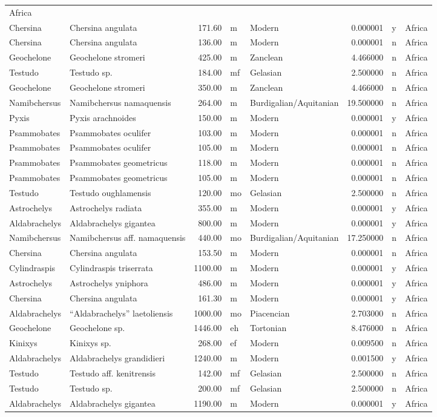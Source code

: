 \begin{landscape}
\begin{longtable}[]{@{}llrllrll@{}}
	Africa\tabularnewline
	Chersina & Chersina angulata & 171.60 & m & Modern & 0.000001 & y &
	Africa\tabularnewline
	Chersina & Chersina angulata & 136.00 & m & Modern & 0.000001 & n &
	Africa\tabularnewline
	Geochelone & Geochelone stromeri & 425.00 & m & Zanclean & 4.466000 & n
	& Africa\tabularnewline
	Testudo & Testudo sp. & 184.00 & mf & Gelasian & 2.500000 & n &
	Africa\tabularnewline
	Geochelone & Geochelone stromeri & 350.00 & m & Zanclean & 4.466000 & n
	& Africa\tabularnewline
	Namibchersus & Namibchersus namaquensis & 264.00 & m &
	Burdigalian/Aquitanian & 19.500000 & n & Africa\tabularnewline
	Pyxis & Pyxis arachnoides & 150.00 & m & Modern & 0.000001 & y &
	Africa\tabularnewline
	Psammobates & Psammobates oculifer & 103.00 & m & Modern & 0.000001 & n
	& Africa\tabularnewline
	Psammobates & Psammobates oculifer & 105.00 & m & Modern & 0.000001 & n
	& Africa\tabularnewline
	Psammobates & Psammobates geometricus & 118.00 & m & Modern & 0.000001 &
	n & Africa\tabularnewline
	Psammobates & Psammobates geometricus & 105.00 & m & Modern & 0.000001 &
	n & Africa\tabularnewline
	Testudo & Testudo oughlamensis & 120.00 & mo & Gelasian & 2.500000 & n &
	Africa\tabularnewline
	Astrochelys & Astrochelys radiata & 355.00 & m & Modern & 0.000001 & y &
	Africa\tabularnewline
	Aldabrachelys & Aldabrachelys gigantea & 800.00 & m & Modern & 0.000001
	& y & Africa\tabularnewline
	Namibchersus & Namibchersus aff. namaquensis & 440.00 & mo &
	Burdigalian/Aquitanian & 17.250000 & n & Africa\tabularnewline
	Chersina & Chersina angulata & 153.50 & m & Modern & 0.000001 & n &
	Africa\tabularnewline
	Cylindraspis & Cylindraspis triserrata & 1100.00 & m & Modern & 0.000001
	& y & Africa\tabularnewline
	Astrochelys & Astrochelys yniphora & 486.00 & m & Modern & 0.000001 & y
	& Africa\tabularnewline
	Chersina & Chersina angulata & 161.30 & m & Modern & 0.000001 & y &
	Africa\tabularnewline
	Aldabrachelys & ``Aldabrachelys'' laetoliensis & 1000.00 & mo &
	Piacencian & 2.703000 & n & Africa\tabularnewline
	Geochelone & Geochelone sp. & 1446.00 & eh & Tortonian & 8.476000 & n &
	Africa\tabularnewline
	Kinixys & Kinixys sp. & 268.00 & ef & Modern & 0.009500 & n &
	Africa\tabularnewline
	Aldabrachelys & Aldabrachelys grandidieri & 1240.00 & m & Modern &
	0.001500 & y & Africa\tabularnewline
	Testudo & Testudo aff. kenitrensis & 142.00 & mf & Gelasian & 2.500000 &
	n & Africa\tabularnewline
	Testudo & Testudo sp. & 200.00 & mf & Gelasian & 2.500000 & n &
	Africa\tabularnewline
	Aldabrachelys & Aldabrachelys gigantea & 1190.00 & m & Modern & 0.000001
	& y & Africa\tabularnewline

\end{longtable}
\end{landscape}
